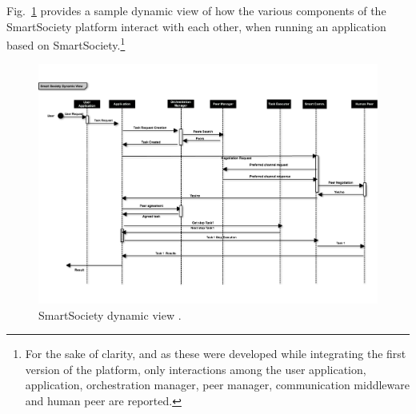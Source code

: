 Fig.~\ref{fig:dynamic_view} provides a sample dynamic view of how the various components of the SmartSociety platform interact with each other, when running an application based on SmartSociety.\footnote{For the sake of clarity, and as these were developed while integrating the first version of the platform, only interactions among the user application, application, orchestration manager, peer manager, communication middleware and human peer are reported.} 
\begin{figure}
 \centering
 \includegraphics[width=1\textwidth]{figs/dynamic_view.pdf}
 \caption{SmartSociety dynamic view .}
 \label{fig:dynamic_view}
\end{figure}


